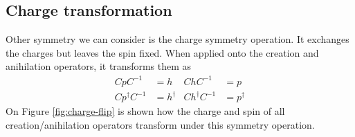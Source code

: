 \subsection{Charge transformation}

Other symmetry we can consider is the charge symmetry operation. It exchanges the charges but leaves the spin fixed. When applied onto the creation and anihilation operators, it transforms them as 
\begin{align*}
  CpC^{-1} &= h & ChC^{-1} &= p \\
  Cp^\dagger C^{-1} &= h^\dagger & Ch^\dagger C^{-1} &= p^\dagger
\end{align*}
On Figure \ref{fig:charge-flip} is shown how the charge and spin of all creation/anihilation operators transform under this symmetry operation.
\begin{figure}
  \begin{center}
    \newcommand{\spinup}[2]{
    \draw[-Triangle , draw=#1, very thick] ([yshift=-1em]#2) -- ([yshift=1em]#2);
    }
    \newcommand{\spindown}[2]{
    \draw[Triangle- , draw=#1, very thick] ([yshift=-1em]#2) -- ([yshift=1em]#2);
    }
    \qquad
\end{center}
\end{figure}
